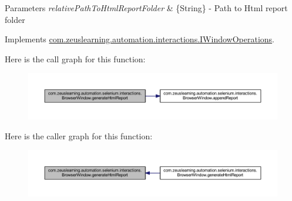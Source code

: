 \begin{DoxyParams}{Parameters}
{\em relative\+Path\+To\+Html\+Report\+Folder} & \{String\} -\/ Path to Html report folder \\
\hline
\end{DoxyParams}


Implements \hyperlink{interfacecom_1_1zeuslearning_1_1automation_1_1interactions_1_1IWindowOperations_a7dba40c542d25adae5781f035e4dbb42}{com.\+zeuslearning.\+automation.\+interactions.\+I\+Window\+Operations}.

Here is the call graph for this function\+:
\nopagebreak
\begin{figure}[H]
\begin{center}
\leavevmode
\includegraphics[width=350pt]{d8/d87/classcom_1_1zeuslearning_1_1automation_1_1selenium_1_1interactions_1_1BrowserWindow_a72167c76169cf3c9b4d270da983f5036_cgraph}
\end{center}
\end{figure}
Here is the caller graph for this function\+:
\nopagebreak
\begin{figure}[H]
\begin{center}
\leavevmode
\includegraphics[width=350pt]{d8/d87/classcom_1_1zeuslearning_1_1automation_1_1selenium_1_1interactions_1_1BrowserWindow_a72167c76169cf3c9b4d270da983f5036_icgraph}
\end{center}
\end{figure}
\hypertarget{classcom_1_1zeuslearning_1_1automation_1_1selenium_1_1interactions_1_1BrowserWindow_a0b6b11b00f45f4b78455962d6b33b33f}{}\label{classcom_1_1zeuslearning_1_1automation_1_1selenium_1_1interactions_1_1BrowserWindow_a0b6b11b00f45f4b78455962d6b33b33f} 
